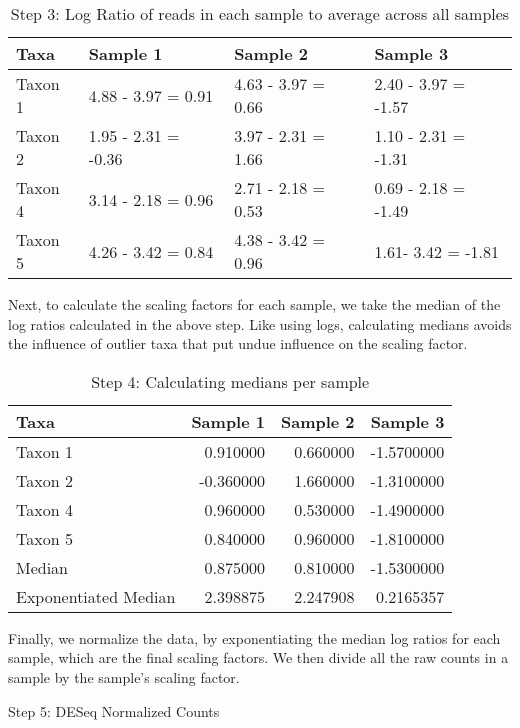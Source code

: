 \documentclass[
]{book}
\begin{document}
\begin{table}

\caption{\label{tab:unnamed-chunk-23}Step 3: Log Ratio of reads in each sample to average across all samples}
\centering
\begin{tabular}[t]{l|l|l|l}
\hline
Taxa & Sample 1 & Sample 2 & Sample 3\\
\hline
Taxon 1 & 4.88 - 3.97 = 0.91 & 4.63 - 3.97 = 0.66 & 2.40 - 3.97 = -1.57\\
\hline
Taxon 2 & 1.95 - 2.31 = -0.36 & 3.97 - 2.31 = 1.66 & 1.10 - 2.31 = -1.31\\
\hline
Taxon 4 & 3.14 - 2.18 = 0.96 & 2.71 - 2.18 = 0.53 & 0.69 - 2.18 = -1.49\\
\hline
Taxon 5 & 4.26 - 3.42 = 0.84 & 4.38 - 3.42 = 0.96 & 1.61- 3.42 = -1.81\\
\hline
\end{tabular}
\end{table}

Next, to calculate the scaling factors for each sample, we take the median of the log ratios calculated in the above step. Like using logs, calculating medians avoids the influence of outlier taxa that put undue influence on the scaling factor.

\begin{table}

\caption{\label{tab:unnamed-chunk-24}Step 4: Calculating medians per sample}
\centering
\begin{tabular}[t]{l|r|r|r}
\hline
Taxa & Sample 1 & Sample 2 & Sample 3\\
\hline
Taxon 1 & 0.910000 & 0.660000 & -1.5700000\\
\hline
Taxon 2 & -0.360000 & 1.660000 & -1.3100000\\
\hline
Taxon 4 & 0.960000 & 0.530000 & -1.4900000\\
\hline
Taxon 5 & 0.840000 & 0.960000 & -1.8100000\\
\hline
Median & 0.875000 & 0.810000 & -1.5300000\\
\hline
Exponentiated Median & 2.398875 & 2.247908 & 0.2165357\\
\hline
\end{tabular}
\end{table}

Finally, we normalize the data, by exponentiating the median log ratios for each sample, which are the final scaling factors. We then divide all the raw counts in a sample by the sample's scaling factor.

\label{tab:unnamed-chunk-25}Step 5: DESeq Normalized Counts
\end{document}
